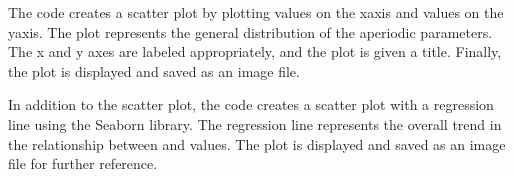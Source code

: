 \documentclass[letterpaper,10pt,english]{sphinxmanual}
\begin{document}
\sphinxAtStartPar
The code creates a scatter plot by plotting  values on the x\sphinxhyphen{}axis and  values on the y\sphinxhyphen{}axis. The plot represents the general distribution of the aperiodic parameters. The x and y axes are labeled appropriately, and the plot is given a title. Finally, the plot is displayed and saved as an image file.

\sphinxAtStartPar
{}

\sphinxAtStartPar
In addition to the scatter plot, the code creates a scatter plot with a regression line using the Seaborn library. The regression line represents the overall trend in the relationship between  and  values. The plot is displayed and saved as an image file for further reference.

\begin{sphinxVerbatim}[commandchars=\\\{\}]

  \PYG{p}{[}\PYG{p}{]}
  \PYG{p}{[}\PYG{p}{]}

 
  
\end{sphinxVerbatim}
\end{document}
